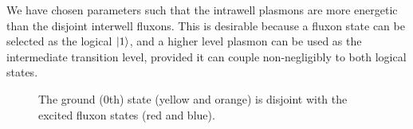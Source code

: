 \documentclass[11pt]{article}
\begin{document}
We have chosen parameters such that the intrawell plasmons are more energetic than the disjoint interwell fluxons. This is desirable because a fluxon state can be selected as the logical $\ket{1}$, and a higher level plasmon can be used as the intermediate transition level, provided it can couple non-negligibly to both logical states. 

\begin{figure}
	\centering
	\hspace{1em}
	\hspace{1em}
	\caption{The ground (0th) state (yellow and orange) is disjoint with the excited fluxon states (red and blue).}
	\label{fig_fluxons}
\end{figure}
\end{document}
